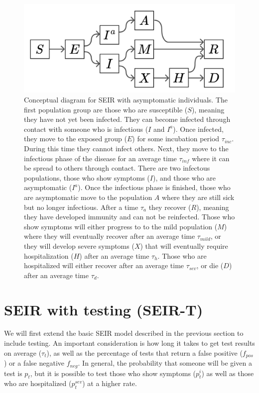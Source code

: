 \documentclass[notitlepage, superscriptaddress]{revtex4-2}
\begin{document}
\begin{figure}
\centering
\includegraphics[width=5in]{Basic_SEIR}
\caption{\label{f:simpleSEIR}
 Conceptual diagram for SEIR with asymptomatic individuals. The first population group are those who are susceptible ($S$), meaning they have not yet been infected. They can become infected through contact with someone who is infectious ($I$ and $I^{a}$). Once infected, they move to the exposed group ($E$) for some incubation period $\tau_{inc}$. During this time they cannot infect others. Next, they move to the infectious phase of the disease for an average time $\tau_{inf}$ where it can be spread to others through contact. There are two infectous populations, those who show symptoms ($I$), and those who are asymptomatic ($I^{a}$). Once the infectious phase is finished, those who are asymptomatic move to the population $A$ where they are still sick but no longer infectious. After a time $\tau_{a}$ they recover ($R$), meaning they have developed immunity and can not be reinfected. Those who show symptoms will either progress to to the mild population ($M$) where they will eventually recover after an average time $\tau_{mild}$, or they will develop severe symptoms ($X$) that will eventually require hospitalization ($H$) after an average time $\tau_{h}$. Those who are hospitalized will either recover after an average time $\tau_{sev}$, or die ($D$) after an average time $\tau_{d}$.}
\end{figure}


\section{SEIR with testing (SEIR-T)}
We will first extend the basic SEIR model described in the previous section to include testing. An important consideration is how long it takes to get test results on average ($\tau_{t}$), as well as the percentage of tests that return a false positive ($f_{pos}$) or a false negative $f_{neg}$. In general, the probability that someone will be given a test is $p_{t}$, but it is possible to test those who show symptoms ($p^{i}_t$) as well as those who are hospitalized ($p^{sev}_{t}$) at a higher rate. 
\end{document}
